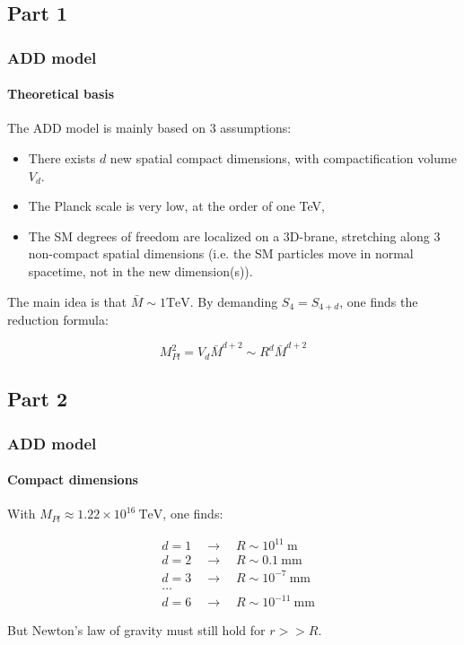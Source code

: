 \documentclass[10pt]{beamer}
\begin{document}
	\subsection{Part 1}
	\begin{frame}
		\frametitle{ADD model}
		\framesubtitle{Theoretical basis}
		The ADD model is mainly based on 3 assumptions:
		
		\begin{itemize}
			\item There exists $d$ new spatial compact dimensions, with compactification volume $V_d$.
			\item The Planck scale is very low, at the order of one TeV,
			\item The SM degrees of freedom are localized on a 3D-brane, stretching along 3 non-compact spatial dimensions (i.e. the SM particles move in normal spacetime, not in the new dimension(s)).
		\end{itemize}
		
		The main idea is that $\bar{M} \sim 1\text{TeV}$.
		By demanding $S_4=S_{4+d}$, one finds the reduction formula:
		
		\begin{equation}
			M_{Pl}^2 = V_d \bar{M}^{d+2} \sim R^d \bar{M}^{d+2}
		\end{equation}
	\end{frame}
	
	\subsection{Part 2}
	\begin{frame}
		\frametitle{ADD model}
		\framesubtitle{Compact dimensions}
		With $M_{Pl} \approx 1.22\times 10^{16}\:\text{TeV}$, one finds:
		
		\begin{align*}
		&d=1\quad\rightarrow\quad R\sim 10^{11}\:\text{m}\\
		&d=2\quad\rightarrow\quad R\sim 0.1\:\text{mm}\\
		&d=3\quad\rightarrow\quad R\sim 10^{-7}\:\text{mm}\\
		&\ldots\\
		&d=6\quad\rightarrow\quad R\sim 10^{-11}\:\text{mm}
		\end{align*}
		
		But Newton's law of gravity must still hold for $r>>R$.
	\end{frame}
	
\end{document}
